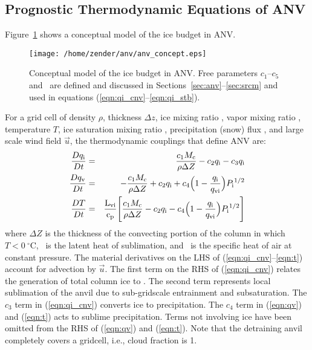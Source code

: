\documentclass[twoside,agums]{aguplus}
\begin{document}
\subsection{Prognostic Thermodynamic Equations of ANV}

Figure~\ref{fig:anv_concept} shows a conceptual model of the ice
budget in ANV.  
\begin{figure}
\begin{center}
\texttt{[image: /home/zender/anv/anv\_concept.eps]}
\end{center}
\caption[Conceptual model of the ice budget in ANV]{
Conceptual model of the ice budget in ANV. 
Free parameters $c_1$--$c_5$ and \pc\ are defined and discussed in
Sections~\ref{sec:anv}--\ref{sec:srcm} and used in 
equations
(\ref{eqn:qi_cnv}--\ref{eqn:qi_stb}).\label{fig:anv_concept}}   
\end{figure}
For a grid cell of density $\rho$,
thickness $\Delta z$, ice mixing ratio \qi, vapor mixing
ratio \qv, temperature $T$, ice saturation mixing ratio \qvi,
precipitation (snow) flux \Psnow, and large scale wind field 
$\vec u$, the thermodynamic couplings that define ANV are:
\begin{eqnarray}
\label{eqn:qi_cnv}
{D\qi \over Dt} & 
= & 
{c_1 \Mc \over \rho \Delta Z} - 
c_2 \qi - 
c_3 \qi \\
\label{eqn:qv}
{D\qv \over Dt} &
= & 
-{c_1 \Mc \over \rho \Delta Z} + 
c_2 \qi + 
c_4 \Bigl(1 - {\qi \over
\qvi}\Bigr)\Psnow^{1/2} \\
\label{eqn:t}
{DT \over Dt} &
= &
{\Lvi \over \cp}\Biggl[
{c_1 \Mc \over \rho \Delta Z} - 
c_2 \qi - 
c_4 \Bigl(1 - {\qi \over \qvi}\Bigr)\Psnow^{1/2}
\Biggr]
\end{eqnarray}
where $\Delta Z$ is the thickness of the convecting portion of the
column in which $T < 0~^\circ$C, \Lvi\ is the latent heat of
sublimation, and \cp\ is the specific heat of air at constant pressure.
The material derivatives on the LHS of
(\ref{eqn:qi_cnv}--\ref{eqn:t}) account for advection by $\vec u$. 
The first term on the RHS of (\ref{eqn:qi_cnv}) relates the generation
of total column ice to \Mc.
The second term represents local sublimation of the anvil due to
sub-gridscale entrainment and subsaturation.
The $c_3$ term in (\ref{eqn:qi_cnv}) converts ice to precipitation.
The $c_4$ term in (\ref{eqn:qv}) and (\ref{eqn:t}) acts to sublime
precipitation.
Terms not involving ice have been omitted from the RHS of
(\ref{eqn:qv}) and (\ref{eqn:t}).
Note that the detraining anvil completely covers a gridcell, i.e.,
cloud fraction is 1.
\end{document}
